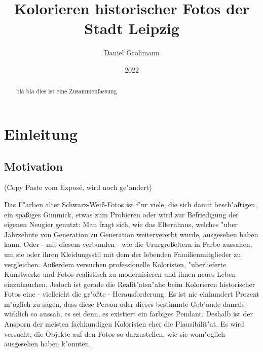 \documentclass[12pt,titlepage]{article}
\begin{document}
\renewcommand{\figurename}{Abb.}

	
\begin{titlepage} %
		\title{Kolorieren historischer Fotos der
			Stadt Leipzig}
		\date{2022}
		\author{Daniel Grohmann}
		\maketitle
\end{titlepage}

\begin{abstract}
    bla bla dies ist eine Zusammenfassung
\end{abstract}

    \pagebreak
    
\tableofcontents

    \pagebreak
    
\listoffigures
    \pagebreak
    
\section{Einleitung}

\subsection{Motivation}
 (Copy Paste vom Expos\'e, wird noch ge"andert)
 
 
Das F"arben alter Schwarz-Wei\ss-Fotos ist f"ur viele, die sich damit besch"aftigen, ein spa\ss iges
Gimmick, etwas zum Probieren oder wird zur Befriedigung der eigenen Neugier genutzt: Man fragt
sich, wie das Elternhaus, welches "uber Jahrzehnte von Generation zu Generation weitervererbt
wurde, ausgesehen haben kann. Oder - mit diesem verbunden - wie die Ururgro\ss eltern in Farbe
aussahen, um sie oder ihren Kleidungsstil mit dem der lebenden Familienmitglieder zu vergleichen.
Au\ss erdem versuchen professionelle Koloristen, "uberlieferte Kunstwerke und Fotos realistisch zu
modernisieren und ihnen neues Leben einzuhauchen. Jedoch ist gerade die Realit"atsn"ahe beim
Kolorieren historischer Fotos eine - vielleicht die gr"o\ss te - Herausforderung. Es ist nie einhundert
Prozent m"oglich zu sagen, dass diese Person oder dieses bestimmte Geb"aude damals wirklich so
aussah, es sei denn, es existiert ein farbiges Pendant. Deshalb ist der Ansporn der meisten
fachkundigen Koloristen eher die Plausibilit"at. Es wird versucht, die Objekte auf den Fotos so
darzustellen, wie sie wom"oglich ausgesehen haben k"onnten.
\end{document}
